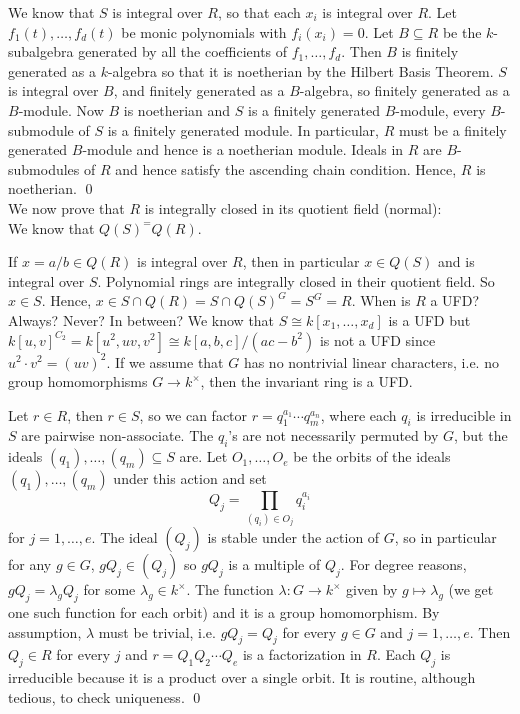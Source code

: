 We know that $S$ is integral over $R$, so that each $x_i$ is integral over $R$. Let $f_1(t), \ldots, f_d(t)$ be monic polynomials with $f_i(x_i)=0$. Let $B \subseteq R$ be the $k$-subalgebra generated by all the coefficients of $f_1,\ldots,f_d$. Then $B$ is finitely generated as a $k$-algebra so that it is noetherian by the Hilbert Basis Theorem. $S$ is integral over $B$, and finitely generated as a $B$-algebra, so finitely generated as a $B$-module. Now $B$ is noetherian and $S$ is a finitely generated $B$-module, every $B$-submodule of $S$ is a finitely generated module. In particular, $R$ must be a finitely generated $B$-module and hence is a noetherian module. Ideals in $R$ are $B$-submodules of $R$ and hence satisfy the ascending chain condition. Hence, $R$ is noetherian. \qed \\



We now prove that $R$ is integrally closed in its quotient field (normal): \\


We know that $Q(S)^= Q(R)$. 




If $x=a/b \in Q(R)$ is integral over $R$, then in particular $x \in Q(S)$ and is integral over $S$. Polynomial rings are integrally closed in their quotient field. So $x \in S$. Hence, $x \in S \cap Q(R)= S \cap Q(S)^G= S^G= R$. When is $R$ a UFD? Always? Never? In between? We know that $S \cong k[x_1,\ldots,x_d]$ is a UFD but $k[u,v]^{C_2}= k[u^2,uv,v^2] \cong k[a,b,c]/(ac-b^2)$ is not a UFD since $u^2 \cdot v^2= (uv)^2$. If we assume that $G$ has no nontrivial linear characters, i.e. no group homomorphisms $G \to k^\times$, then the invariant ring is a UFD. 

\pf Let $r \in R$, then $r \in S$, so we can factor $r= q_1^{a_1} \cdots q_m^{a_n}$, where each $q_i$ is irreducible in $S$ are pairwise non-associate. The $q_i$'s are not necessarily permuted by $G$, but the ideals $(q_1),\ldots,(q_m) \subseteq S$ are. Let $O_1,\ldots,O_e$ be the orbits of the ideals $(q_1),\ldots,(q_m)$ under this action and set
	\[
	Q_j = \prod_{(q_i) \in O_j} q_i^{a_i}
	\]
for $j=1,\ldots,e$. The ideal $(Q_j)$ is stable under the action of $G$, so in particular for any $g \in G$, $gQ_j \in (Q_j)$ so $gQ_j$ is a multiple of $Q_j$. For degree reasons, $gQ_j= \lambda_g Q_j$ for some $\lambda_g \in k^\times$. The function $\lambda: G \to k^\times$ given by $g \mapsto \lambda_g$ (we get one such function for each orbit) and it is a group homomorphism. By assumption, $\lambda$ must be trivial, i.e. $gQ_j= Q_j$ for every $g \in G$ and $j=1,\ldots,e$. Then $Q_j \in R$ for every $j$ and $r= Q_1Q_2 \cdots Q_e$ is a factorization in $R$. Each $Q_j$ is irreducible because it is a product over a single orbit. It is routine, although tedious, to check uniqueness. \qed \\


